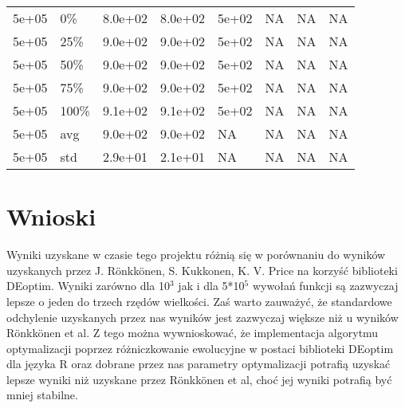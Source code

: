 \documentclass[11pt]{article}
\begin{document}
{\begin{longtable}{llllllll}
  5e+05 & 0\% & 8.0e+02 & 8.0e+02 & 5e+02 & NA & NA & NA \\ 
  5e+05 & 25\% & 9.0e+02 & 9.0e+02 & 5e+02 & NA & NA & NA \\ 
  5e+05 & 50\% & 9.0e+02 & 9.0e+02 & 5e+02 & NA & NA & NA \\ 
  5e+05 & 75\% & 9.0e+02 & 9.0e+02 & 5e+02 & NA & NA & NA \\ 
  5e+05 & 100\% & 9.1e+02 & 9.1e+02 & 5e+02 & NA & NA & NA \\ 
  5e+05 & avg & 9.0e+02 & 9.0e+02 &    NA & NA & NA & NA \\ 
  5e+05 & std & 2.9e+01 & 2.1e+01 &    NA & NA & NA & NA \\ 
   \hline
\hline
\end{longtable}
\newpage

}
\section{Wnioski}
\label{sec-5}


Wyniki uzyskane w czasie tego projektu różnią się w porównaniu do
wyników uzyskanych przez J. Rönkkönen, S. Kukkonen, K. V. Price na
korzyść biblioteki DEoptim. Wyniki zarówno dla 10$^3$ jak i dla 5*10$^5$
wywołań funkcji są zazwyczaj lepsze o jeden do trzech rzędów
wielkości. Zaś warto zauważyć, że standardowe odchylenie uzyskanych
przez nas wyników jest zazwyczaj większe niż u wyników Rönkkönen et
al. Z tego można wywnioskować, że implementacja algorytmu
optymalizacji poprzez różniczkowanie ewolucyjne w postaci biblioteki
DEoptim dla języka R oraz dobrane przez nas parametry optymalizacji
potrafią uzyskać lepsze wyniki niż uzyskane przez Rönkkönen et al,
choć jej wyniki potrafią być mniej stabilne.
\end{document}
